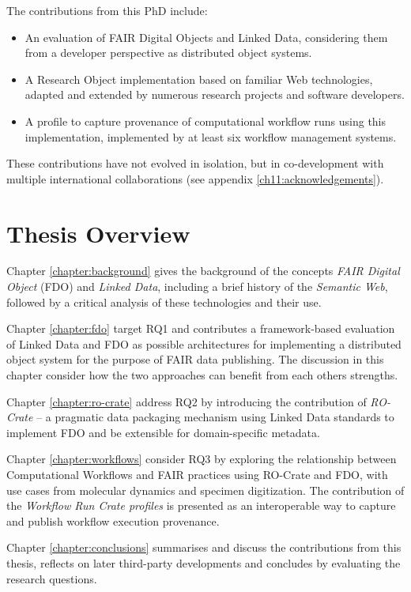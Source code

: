 The contributions from this PhD include:

\begin{itemize}
    \item An evaluation of FAIR Digital Objects and Linked Data, considering them from a developer perspective as distributed object systems.
    \item A Research Object implementation based on familiar Web technologies, adapted and extended by numerous research projects and software developers.
    \item A profile to capture provenance of computational workflow runs using this implementation, implemented by at least six workflow management systems.
\end{itemize}

These contributions have not evolved in isolation, but in co-development with multiple international collaborations (see appendix \vref{ch11:acknowledgements}).


\section{Thesis Overview}
\label{intro:overview}

Chapter \vref{chapter:background} gives the background of the concepts \emph{FAIR Digital Object} (FDO) and \emph{Linked Data}, including a brief history of the \emph{Semantic Web}, followed by a critical analysis of these technologies and their use. 

Chapter \vref{chapter:fdo} target RQ1 and contributes a framework-based evaluation of Linked Data and FDO as possible architectures for implementing a distributed object system for the purpose of FAIR data publishing. The discussion in this chapter consider how the two approaches can benefit from each others strengths. 

Chapter \vref{chapter:ro-crate} address RQ2 by introducing the contribution of \emph{RO-Crate} -- a pragmatic data packaging mechanism using Linked Data standards to implement FDO and be extensible for domain-specific metadata.  

Chapter \vref{chapter:workflows} consider RQ3 by exploring the relationship between Computational Workflows and FAIR practices using RO-Crate and FDO, with use cases from molecular dynamics and specimen digitization. The contribution of the \emph{Workflow Run Crate profiles} is presented as an interoperable way to capture and publish workflow execution provenance. 

Chapter \vref{chapter:conclusions} summarises and discuss the contributions from this thesis, reflects on later third-party developments and concludes by evaluating the research questions.



